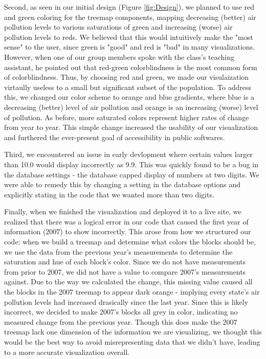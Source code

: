\documentclass[journal]{vgtc}                %
\begin{document}
Second, as seen in our initial design (Figure \ref{fig:Design}), we planned to use red and green coloring for the treemap components, mapping
decreasing (better) air pollution levels to various saturations of green and increasing (worse) air pollution levels to reds. We believed
that this would intuitively make the "most sense" to the user, since green is "good" and red is "bad" in many visualizations. However, when
one of our group members spoke with the class's teaching assistant, he pointed out that red-green colorblindness is the most common form of
colorblindness. Thus, by choosing red and green, we made our visulaization virtaully useless to a small but significant subset of the population.
To address this, we changed our color scheme to orange and blue gradients, where blue is a decreasing (better) level of air pollution and orange
is an increasing (worse) level of pollution. As before, more saturated colors represent higher rates of change from year to year. This simple change
increased the usability of our visualization and furthered the ever-present goal of accessibility in public softwares.

Third, we encountered an issue in early devlopment where certain values larger than 10.0 would display incorrectly as 9.9. This was quickly
found to be a bug in the database settings - the database capped display of numbers at two digits. We were able to remedy this by changing 
a setting in the database options and explicitly stating in the code that we wanted more than two digits. 

Finally, when we finished the visualization and deployed it to a live site, we realized that there was a logical error in our code
that caused the first year of information (2007) to show incorrectly. This arose from how we structured our code: when we build a 
treemap and determine what colors the blocks should be, we use the data from the previous year's measurements to determine the saturation
and hue of each block's color. Since we do not have measurements from prior to 2007, we did not have a value to compare 2007's measurements
against. Due to the way we calculated the change, this missing value caused all the blocks in the 2007 treemap to appear dark orange - implying
every state's air pollution levels had increased drasically since the last year. Since this is likely incorrect, we decided to make 2007's blocks
all grey in color, indicating no measured change from the previous year. Though this does make the 2007 treemap lack one dimension of the information
we are visualizing, we thought this would be the best way to avoid misrepresenting data that we didn't have, leading to a more accurate
visualization overall.
\end{document}

